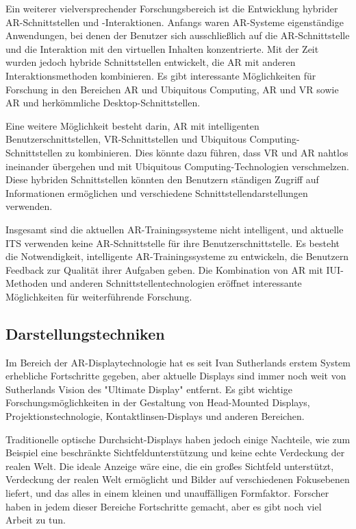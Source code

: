 Ein weiterer vielversprechender Forschungsbereich ist die Entwicklung hybrider
AR-Schnittstellen und -Interaktionen. Anfangs waren AR-Systeme eigenständige
Anwendungen, bei denen der Benutzer sich ausschließlich auf die
AR-Schnittstelle und die Interaktion mit den virtuellen Inhalten konzentrierte.
Mit der Zeit wurden jedoch hybride Schnittstellen entwickelt, die AR mit
anderen Interaktionsmethoden kombinieren. Es gibt interessante Möglichkeiten
für Forschung in den Bereichen AR und Ubiquitous Computing, AR und VR sowie AR
und herkömmliche Desktop-Schnittstellen.

Eine weitere Möglichkeit besteht darin, AR mit intelligenten
Benutzerschnittstellen, VR-Schnittstellen und Ubiquitous
Computing-Schnittstellen zu kombinieren. Dies könnte dazu führen, dass VR und
AR nahtlos ineinander übergehen und mit Ubiquitous Computing-Technologien
verschmelzen. Diese hybriden Schnittstellen könnten den Benutzern ständigen
Zugriff auf Informationen ermöglichen und verschiedene
Schnittstellendarstellungen verwenden.

Insgesamt sind die aktuellen AR-Trainingssysteme nicht intelligent, und
aktuelle ITS verwenden keine AR-Schnittstelle für ihre Benutzerschnittstelle.
Es besteht die Notwendigkeit, intelligente AR-Trainingssysteme zu entwickeln,
die Benutzern Feedback zur Qualität ihrer Aufgaben geben. Die Kombination von
AR mit IUI-Methoden und anderen Schnittstellentechnologien eröffnet
interessante Möglichkeiten für weiterführende Forschung.
\subsection{Darstellungstechniken}
Im Bereich der AR-Displaytechnologie hat es seit Ivan Sutherlands erstem System
erhebliche Fortschritte gegeben, aber aktuelle Displays sind immer noch weit
von Sutherlands Vision des "Ultimate Display" entfernt. Es gibt wichtige
Forschungsmöglichkeiten in der Gestaltung von Head-Mounted Displays,
Projektionstechnologie, Kontaktlinsen-Displays und anderen Bereichen.

Traditionelle optische Durchsicht-Displays haben jedoch einige Nachteile, wie
zum Beispiel eine beschränkte Sichtfeldunterstützung und keine echte Verdeckung
der realen Welt. Die ideale Anzeige wäre eine, die ein großes Sichtfeld
unterstützt, Verdeckung der realen Welt ermöglicht und Bilder auf verschiedenen
Fokusebenen liefert, und das alles in einem kleinen und unauffälligen
Formfaktor. Forscher haben in jedem dieser Bereiche Fortschritte gemacht, aber
es gibt noch viel Arbeit zu tun.

